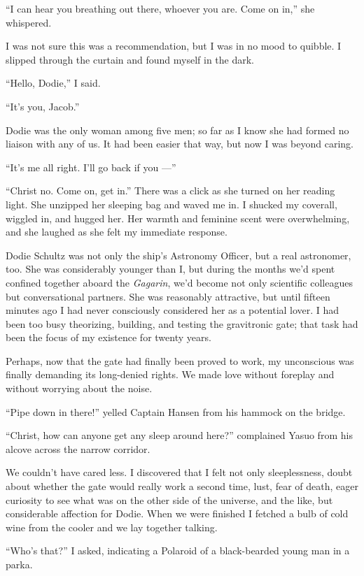 \documentclass[english,11pt,letterpaper,onecolumn]{scrbook}
\begin{document}
	``I can hear you breathing out there, whoever you are.  Come on in,'' she whispered.

	I was not sure this was a recommendation, but I was in no mood to quibble.  I slipped through the curtain and found myself in the dark.

	``Hello, Dodie,'' I said.

	``It's you, Jacob.''

	Dodie was the only woman among five men; so far as I know she had formed no liaison with any of us.  It had been easier that way, but now I was beyond caring.

	``It's me all right.  I'll go back if you ---''

	``Christ no.  Come on, get in.''  There was a click as she turned on her reading light.  She unzipped her sleeping bag and waved me in.  I shucked my coverall, wiggled in, and hugged her.  Her warmth and feminine scent were overwhelming, and she laughed as she felt my immediate response.

	Dodie Schultz was not only the ship's Astronomy Officer, but a real astronomer, too.  She was considerably younger than I, but during the months we'd spent confined together aboard the \emph{Gagarin}, we'd become not only scientific colleagues but  conversational partners.  She was reasonably attractive, but until fifteen minutes ago I had never consciously considered her as a potential lover.  I had been too busy theorizing, building, and testing the gravitronic gate; that task had been the focus of my existence for twenty years.

	Perhaps, now that the gate had finally been proved to work, my unconscious was finally demanding its long-denied rights.  We made love without foreplay and without worrying about the noise.

	``Pipe down in there!'' yelled Captain Hansen from his hammock on the bridge.

	``Christ, how can anyone get any sleep around here?'' complained Yasuo from his alcove across the narrow corridor.

	We couldn't have cared less.  I discovered that I felt not only sleeplessness, doubt about whether the gate would really work a second time, lust, fear of death, eager curiosity to see what was on the other side of the universe, and the like, but considerable affection for Dodie.  When we were finished I fetched a bulb of cold wine from the cooler and we lay together talking.

	``Who's that?'' I asked, indicating a Polaroid of a black-bearded young man in a parka.
\end{document}
